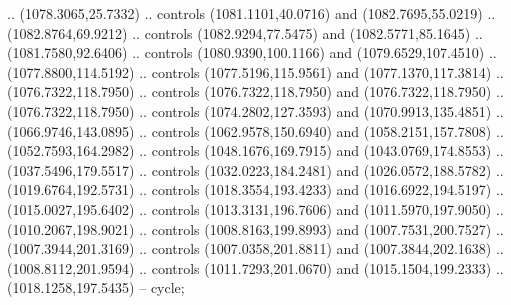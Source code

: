 \begin{scope}[shift={(-127.26916,-608.18524)}]
\begin{scope}
\begin{scope}[shift={(-630.60299,773.9938)},opacity=0.500,transparency group]
        .. (1078.3065,25.7332) .. controls (1081.1101,40.0716) and (1082.7695,55.0219)
        .. (1082.8764,69.9212) .. controls (1082.9294,77.5475) and (1082.5771,85.1645)
        .. (1081.7580,92.6406) .. controls (1080.9390,100.1166) and
        (1079.6529,107.4510) .. (1077.8800,114.5192) .. controls (1077.5196,115.9561)
        and (1077.1370,117.3814) .. (1076.7322,118.7950) .. controls
        (1076.7322,118.7950) and (1076.7322,118.7950) .. (1076.7322,118.7950) ..
        controls (1074.2802,127.3593) and (1070.9913,135.4851) .. (1066.9746,143.0895)
        .. controls (1062.9578,150.6940) and (1058.2151,157.7808) ..
        (1052.7593,164.2982) .. controls (1048.1676,169.7915) and (1043.0769,174.8553)
        .. (1037.5496,179.5517) .. controls (1032.0223,184.2481) and
        (1026.0572,188.5782) .. (1019.6764,192.5731) .. controls (1018.3554,193.4233)
        and (1016.6922,194.5197) .. (1015.0027,195.6402) .. controls
        (1013.3131,196.7606) and (1011.5970,197.9050) .. (1010.2067,198.9021) ..
        controls (1008.8163,199.8993) and (1007.7531,200.7527) .. (1007.3944,201.3169)
        .. controls (1007.0358,201.8811) and (1007.3844,202.1638) ..
        (1008.8112,201.9594) .. controls (1011.7293,201.0670) and (1015.1504,199.2333)
        .. (1018.1258,197.5435) -- cycle;


\end{scope}
\end{scope}
\end{scope}

